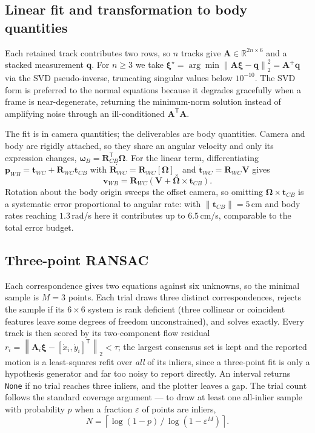 \documentclass[10pt]{article}
\newcommand{\R}{\mathbf{R}}
\newcommand{\vt}[1]{\mathbf{#1}}
\newcommand{\Rwc}{\R_{WC}}
\newcommand{\Rcb}{\R_{CB}}
\newcommand{\norm}[1]{\left\lVert#1\right\rVert}
\newcommand{\skewm}[1]{\left[#1\right]_{\times}}
\begin{document}
\subsection{Linear fit and transformation to body quantities}

Each retained track contributes two rows, so $n$ tracks give $\mathbf{A}\in\mathbb{R}^{2n\times6}$
and a stacked measurement $\vt{q}$. For $n\ge3$ we take
$\bm{\xi}^\star = \arg\min\norm{\mathbf{A}\bm{\xi}-\vt{q}}_2^2 = \mathbf{A}^{+}\vt{q}$ via the SVD
pseudo-inverse, truncating singular values below $10^{-10}$. The SVD form is preferred to the normal
equations because it degrades gracefully when a frame is near-degenerate, returning the minimum-norm
solution instead of amplifying noise through an ill-conditioned
$\mathbf{A}^{\mathsf T}\mathbf{A}$.

The fit is in camera quantities; the deliverables are body quantities. Camera and body are rigidly
attached, so they share an angular velocity and only its expression changes,
$\bm{\omega}_B = \Rcb^{\mathsf T}\bm{\Omega}$. For the linear term, differentiating
$\vt{p}_{WB} = \vt{t}_{WC}+\Rwc\vt{t}_{CB}$ with $\dot{\Rwc}=\Rwc\skewm{\bm{\Omega}}$ and
$\dot{\vt{t}}_{WC}=\Rwc\vt{V}$ gives
\begin{equation}
\boxed{\ \vt{v}_{WB} = \Rwc\left(\vt{V}+\bm{\Omega}\times\vt{t}_{CB}\right).\ }
\label{eq:leverarm}
\end{equation}
Rotation about the body origin sweeps the offset camera, so omitting
$\bm{\Omega}\times\vt{t}_{CB}$ is a systematic error proportional to angular rate: with
$\norm{\vt{t}_{CB}}=5\,$cm and body rates reaching $1.3\,$rad/s here it contributes up to
$6.5\,$cm/s, comparable to the total error budget.

\subsection{Three-point RANSAC}

Each correspondence gives two equations against six unknowns, so the minimal sample is $M=3$ points.
Each trial draws three distinct correspondences, rejects the sample if its $6\times6$ system is rank
deficient (three collinear or coincident features leave some degrees of freedom unconstrained), and
solves exactly. Every track is then scored by its two-component flow residual
$r_i = \norm{\mathbf{A}_i\bm{\xi}-[\dot x_i,\dot y_i]^{\mathsf T}}_2 < \tau$; the largest consensus
set is kept and the reported motion is a least-squares refit over \emph{all} of its inliers, since a
three-point fit is only a hypothesis generator and far too noisy to report directly. An interval
returns \texttt{None} if no trial reaches three inliers, and the plotter leaves a gap. The trial
count follows the standard coverage argument --- to draw at least one all-inlier sample with
probability $p$ when a fraction $\varepsilon$ of points are inliers,
\begin{equation}
N = \left\lceil \log(1-p)\,/\,\log\!\left(1-\varepsilon^{M}\right) \right\rceil .
\label{eq:iters}
\end{equation}
\end{document}

